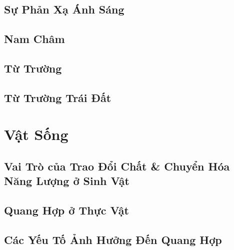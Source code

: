 \documentclass{article}
\numberwithin{equation}{section}
\begin{document}

\subsection{Sự Phản Xạ Ánh Sáng}


\subsection{Nam Châm}


\subsection{Từ Trường}


\subsection{Từ Trường Trái Đất}


\section{Vật Sống}

\subsection{Vai Trò của Trao Đổi Chất \& Chuyển Hóa Năng Lượng ở Sinh Vật}


\subsection{Quang Hợp ở Thực Vật}


\subsection{Các Yếu Tố Ảnh Hưởng Đến Quang Hợp}
\end{document}
